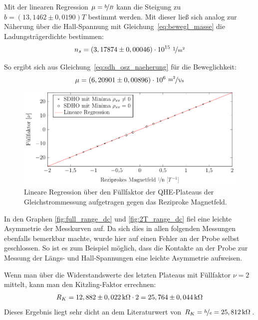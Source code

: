 Mit der linearen Regression $\mu = \nicefrac{b}{B}$ kann die Steigung zu $b=(13,1462 \pm 0,0190)\unit{T}$ bestimmt werden. Mit dieser ließ sich analog zur Näherung über die Hall-Spannung mit Gleichung~\eqref{eq:bewegl_masse} die Ladungsträgerdichte bestimmen:
\begin{equation}
n_s=  ( 3,17874 \pm 0,00046) \cdot 10^{15} ~ \unitfrac{1}{m^2}\\ %
\end{equation}

So ergibt sich aus Gleichung~\eqref{eq:sdh_osz_naeherung} für die Beweglichkeit:
\begin{equation}
\mu= (6,20901\pm 0,00896)\cdot 10^6 ~ \unitfrac{m^2}{Vs} %
\end{equation}
 

\begin{figure}[h]
	\centering
	\includegraphics{graphs/dc/auswertung.pdf}
	\caption[Lineare Regression Gleichstrommessung]{
		Lineare Regression über den Füllfaktor der QHE-Plateaus der Gleichstrommessung aufgetragen gegen das Reziproke Magnetfeld.
	}
	\label{fig:dc_sdho_ausw}
\end{figure}

In den Graphen \ref{fig:full_range_dc} und \ref{fig:2T_range_dc} fiel eine leichte Asymmetrie der Messkurven auf. Da sich dies in allen folgenden Messungen ebenfalls bemerkbar machte, wurde hier auf einen Fehler an der Probe selbst geschlossen. So ist es zum Beispiel möglich, dass die Kontakte an der Probe zur Messung der Längs- und Hall-Spannungen eine leichte Asymmetrie aufweisen.

Wenn man über die Widerstandswerte des letzten Plateaus mit Füllfaktor $\nu = 2$ mittelt, kann man den Kitzling-Faktor errechnen:
$$ R_K = \unit[12,882 \pm 0,022]{k \Omega} \cdot 2 = \unit[25,764 \pm 0,044]{k \Omega}$$
Dieses Ergebnis liegt sehr dicht an dem Literaturwert von $R_K=\nicefrac{h}{e}=\unit[25,812]{k \Omega}$.